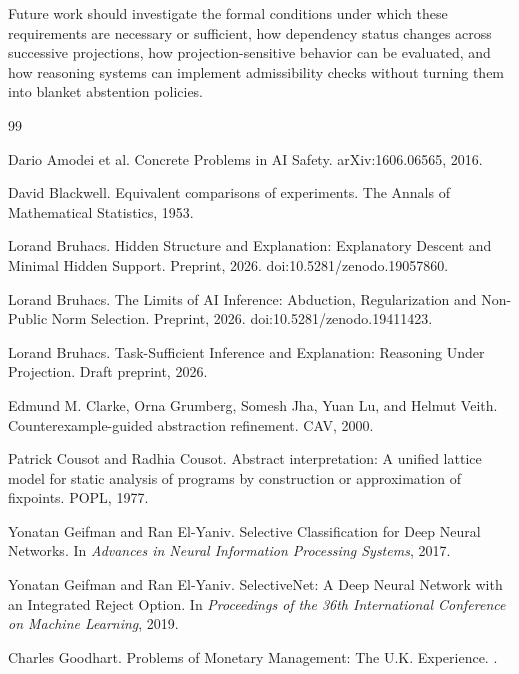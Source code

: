 \documentclass[11pt]{article}
\begin{document}
Future work should investigate the formal conditions under which these requirements are necessary or sufficient, how dependency status changes across successive projections, how projection-sensitive behavior can be evaluated, and how reasoning systems can implement admissibility checks without turning them into blanket abstention policies.

\begin{thebibliography}{99}

Dario Amodei et al.
\newblock Concrete Problems in AI Safety.
\newblock arXiv:1606.06565, 2016.

David Blackwell.
\newblock Equivalent comparisons of experiments.
\newblock The Annals of Mathematical Statistics, 1953.

Lorand Bruhacs.
\newblock Hidden Structure and Explanation: Explanatory Descent and Minimal Hidden Support.
\newblock Preprint, 2026.
\newblock doi:10.5281/zenodo.19057860.

Lorand Bruhacs.
\newblock The Limits of AI Inference: Abduction, Regularization and Non-Public Norm Selection.
\newblock Preprint, 2026.
\newblock doi:10.5281/zenodo.19411423.

Lorand Bruhacs.
\newblock Task-Sufficient Inference and Explanation: Reasoning Under Projection.
\newblock Draft preprint, 2026.

Edmund M. Clarke, Orna Grumberg, Somesh Jha, Yuan Lu, and Helmut Veith.
\newblock Counterexample-guided abstraction refinement.
\newblock CAV, 2000.

Patrick Cousot and Radhia Cousot.
\newblock Abstract interpretation: A unified lattice model for static analysis of programs by construction or approximation of fixpoints.
\newblock POPL, 1977.

Yonatan Geifman and Ran El-Yaniv.
\newblock Selective Classification for Deep Neural Networks.
\newblock In \emph{Advances in Neural Information Processing Systems}, 2017.

Yonatan Geifman and Ran El-Yaniv.
\newblock SelectiveNet: A Deep Neural Network with an Integrated Reject Option.
\newblock In \emph{Proceedings of the 36th International Conference on Machine Learning}, 2019.

Charles Goodhart.
\newblock Problems of Monetary Management: The U.K. Experience.
.


\end{thebibliography}
\end{document}
